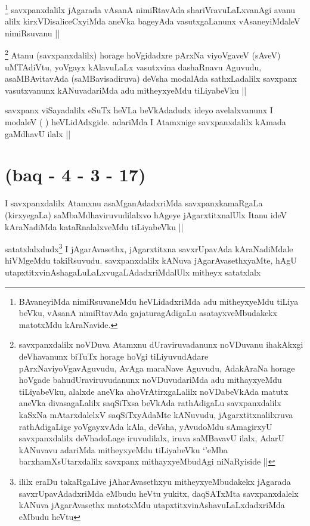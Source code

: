 \begin{artha}
\footnote{BAvaneyiMda nimiRsuvaneMdu heVLidadxriMda adu mitheyxyeMdu tiLiya beVku, vAsanA nimiRtavAda gajaturagAdigaLu asatayxveMbudakekx matotxMdu kAraNavide.}
savxpanxdalilx jAgarada vAsanA nimiRtavAda shariVravuLaLxvanAgi avanu alilx kirxVDisaliceCxyiMda aneVka bageyAda vasutxgaLanunx vAsaneyiMdaleV nimiRsuvanu ||
\end{artha}

\begin{artha}
\footnote{savxpanxdalilx noVDuva Atamxnu dUraviruvadanunx noVDuvanu ihakAkxgi deVhavanunx biTuTx horage hoVgi tiLiyuvudAdare pArxNaviyoVgavAguvudu, AvAga maraNave Aguvudu, AdakAraNa horage hoVgade bahudUraviruvudanunx noVDuvudariMda adu mithayxyeMdu tiLiyabeVku, alalxde aneVka ahoVrAtirxgaLalilx noVDabeVkAda matutx aneVka divasagaLalilx saqSiTxsa beVkAda rathAdigaLu savxpanxdalilx kaSxNa mAtarxdalelxV saqSiTxyAdaMte kANuvudu, jAgarxtitxnalilxruva rathAdigaLige yoVgayxvAda kAla, deVsha, yAvudoMdu sAmagirxyU savxpanxdalilx deVhadoLage iruvudilalx, iruva saMBavavU ilalx, AdarU kANuvavu adariMda mitheyxyeMdu tiLiyabeVku `\stext'eMba barxhamXsUtarxdalilx savxpanx mithayxyeMbudAgi niNaRyiside ||}
Atanu (savxpanxdalilx) horage hoVgidadxre pArxNa viyoVgaveV (sAveV) uMTAdiVtu, yoVgayx kAlavuLaLx vasutxvina dashaRnavu Aguvudu, asaMBAvitavAda (saMBavisadiruva) deVsha modalAda sathxLadalilx savxpanx vasutxvanunx kANuvadariMda adu mitheyxyeMdu tiLiyabeVku ||
\end{artha}

\begin{artha}
savxpanx viSayadalilx eSuTx heVLa beVkAdadudx ideyo avelalxvanunx I modaleV ( ) heVLidAdxgide. adariMda I Atamxnige savxpanxdalilx kAmada gaMdhavU ilalx ||
\end{artha}

\section*{(baq - 4 - 3 - 17)}
 

\begin{artha}
I savxpanxdalilx Atamxnu asaMganAdadxriMda savxpanxkamaRgaLa (kirxyegaLa) saMbaMdhaviruvudilalxvo hAgeye jAgarxtitxnalUlx Itanu ideV kAraNadiMda kataRnalalxveMdu tiLiyabeVku ||
\end{artha}

\begin{artha}
satatxlalxdudx\footnote{ililx eraDu takaRgaLive jAharAvasethxyu mitheyxyeMbudakekx jAgarada savxrUpavAdadxriMda eMbudu heVtu yukitx, daqSATxMta savxpanxdalelx kANuva jAgarAvasethx matotxMdu utapxtitxvinAshavuLaLxdadxriMda eMbudu heVtu} I jAgarAvasethx, jAgarxtitxna savxrUpavAda kAraNadiMdale hiVMgeMdu takiRsuvudu. savxpanxdalilx kANuva jAgarAvasethxyaMte, hAgU utapxtitxvinAshagaLuLaLxvugaLAdadxriMdalUlx mitheyx satatxlalx
\end{artha}

